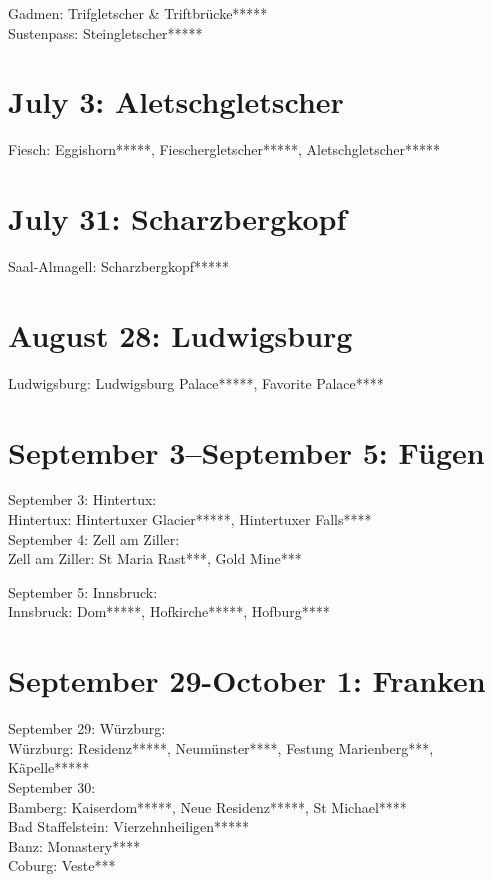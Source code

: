 Gadmen: Trifgletscher \& Triftbr\"ucke*****\\
Sustenpass: Steingletscher*****

\section{July 3: Aletschgletscher}
\label{Aletsch2011}

Fiesch: Eggishorn*****, Fieschergletscher*****, Aletschgletscher*****

\section{July 31: Scharzbergkopf}
\label{Saasalmagell2011}

Saal-Almagell: Scharzbergkopf*****

\section{August 28: Ludwigsburg}
\label{Ludwigsburg2011}

Ludwigsburg: Ludwigsburg Palace*****, Favorite Palace****

\section{September 3--September 5: F\"ugen}
\label{Tirol2011}

September 3: Hintertux:\\
Hintertux: Hintertuxer Glacier*****, Hintertuxer Falls****\\

September 4: Zell am Ziller:\\
Zell am Ziller: St Maria Rast***, Gold Mine***

September 5: Innsbruck:\\
Innsbruck: Dom*****, Hofkirche*****, Hofburg****

\section{September 29-October 1: Franken}
\label{Franken2011}

September 29: W\"urzburg:\\
W\"urzburg: Residenz*****, Neum\"unster****, Festung Marienberg***, K\"apelle*****\\

September 30:\\
Bamberg: Kaiserdom*****, Neue Residenz*****, St Michael****\\
Bad Staffelstein: Vierzehnheiligen*****\\
Banz: Monastery****\\
Coburg: Veste***\\

